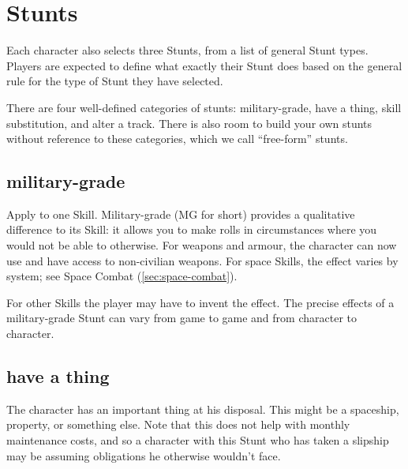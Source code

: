 \section{Stunts}\label{sec:Stunts} %

Each character also selects three Stunts, from a list of general Stunt types. Players are expected to define what exactly their Stunt does based on the general rule for the type of Stunt they have selected.


There are four well-defined categories of stunts: military-grade, have a thing, skill substitution, and alter a track. There is also room to build your own stunts without reference to these categories, which we call ``free-form'' stunts.

\subsection{military-grade}

Apply to one Skill. Military-grade (MG for short) provides a qualitative difference to its Skill: it allows you to make rolls in circumstances where you would not be able to otherwise. For weapons and armour, the character can now use and have access to non-civilian weapons. For space Skills, the effect varies by system; see Space Combat (\autoref{sec:space-combat}).

For other Skills the player may have to invent the effect. The precise effects of a military-grade Stunt can vary from game to game and from character to character.

\subsection{have a thing}

The character has an important thing at his disposal. This might be a spaceship, property, or something else. Note that this does not help with monthly maintenance costs, and so a character with this Stunt who has taken a slipship may be assuming obligations he otherwise wouldn't face.


